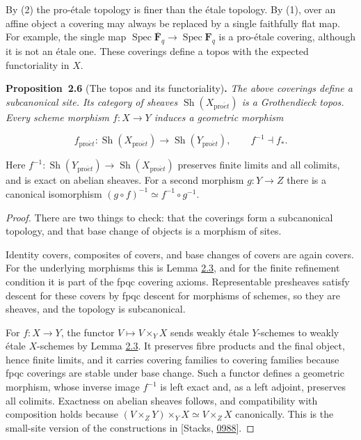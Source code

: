 \documentclass[11pt]{article}
\newenvironment{bpstatement}[2]{\par\addvspace{0.6\baselineskip}\noindent\textbf{#1}#2\textbf{.}\enspace\ignorespaces}
  {\par\addvspace{0.4\baselineskip}}
\newenvironment{bpstatementit}[2]{\begin{bpstatement}{#1}{#2}\itshape\ignorespaces}{\end{bpstatement}}
\providecommand{\Sh}{}\renewcommand{\Sh}{\operatorname{Sh}}
\begin{document}
\label{bp18}%
By (2) the pro-étale topology is finer than the étale topology. By (1), over an affine object a covering may always be replaced by a single faithfully flat map. For example, the single map \(\operatorname{Spec}\overline{\mathbf F}_q\to\operatorname{Spec}\mathbf F_q\) is a pro-étale covering, although it is not an étale one. These coverings define a topos with the expected functoriality in \(X\).

\label{bp19}%
\begin{bpstatementit}{Proposition~2.6}{ (The topos and its functoriality)}
The above coverings define a subcanonical site. Its category of sheaves \(\Sh(X_{\mathrm{pro}\acute{e}t})\) is a Grothendieck topos. Every scheme morphism \(f:X\to Y\) induces a geometric morphism

\[
f_{\mathrm{pro}\acute{e}t}:\Sh(X_{\mathrm{pro}\acute{e}t})\longrightarrow\Sh(Y_{\mathrm{pro}\acute{e}t}),
\qquad f^{-1}\dashv f_*.
\]

Here \(f^{-1}:\Sh(Y_{\mathrm{pro}\acute{e}t})\to\Sh(X_{\mathrm{pro}\acute{e}t})\) preserves finite limits and all colimits, and is exact on abelian sheaves. For a second morphism \(g:Y\to Z\) there is a canonical isomorphism \((g\circ f)^{-1}\simeq f^{-1}\circ g^{-1}\).
\end{bpstatementit}

\begin{proof}[{Proof}]\label{bp20}%
There are two things to check: that the coverings form a subcanonical topology, and that base change of objects is a morphism of sites.

Identity covers, composites of covers, and base changes of covers are again covers. For the underlying morphisms this is Lemma \hyperref[bp12]{2.3}, and for the finite refinement condition it is part of the fpqc covering axioms. Representable presheaves satisfy descent for these covers by fpqc descent for morphisms of schemes, so they are sheaves, and the topology is subcanonical.

For \(f:X\to Y\), the functor \(V\mapsto V\times_YX\) sends weakly étale \(Y\)-schemes to weakly étale \(X\)-schemes by Lemma \hyperref[bp12]{2.3}. It preserves fibre products and the final object, hence finite limits, and it carries covering families to covering families because fpqc coverings are stable under base change. Such a functor defines a geometric morphism, whose inverse image \(f^{-1}\) is left exact and, as a left adjoint, preserves all colimits. Exactness on abelian sheaves follows, and compatibility with composition holds because \((V\times_ZY)\times_YX\simeq V\times_ZX\) canonically. This is the small-site version of the constructions in [Stacks, \href{https://stacks.math.columbia.edu/tag/0988}{0988}].
\end{proof}
\end{document}
